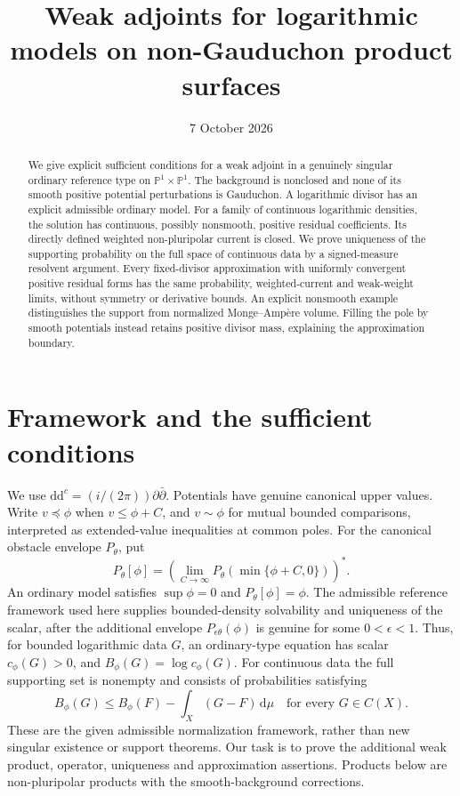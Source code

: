 \documentclass[11pt]{article}
\title{Weak adjoints for logarithmic models on non-Gauduchon product surfaces}
\author{}
\date{7 October 2026}
\newcommand{\ddc}{\mathrm{d}\mathrm{d}^c}
\begin{document}
\maketitle
\begin{abstract}
We give explicit sufficient conditions for a weak adjoint in a genuinely
singular ordinary reference type on $\mathbb P^1\times\mathbb P^1$.
The background is nonclosed and none of its smooth positive potential
perturbations is Gauduchon. A logarithmic divisor has an explicit admissible
ordinary model. For a family of continuous logarithmic densities, the
solution has continuous, possibly nonsmooth, positive residual coefficients.
Its directly defined weighted non-pluripolar current is closed. We prove
uniqueness of the supporting probability on the full space of continuous
data by a signed-measure resolvent argument. Every fixed-divisor approximation
with uniformly convergent positive residual forms has the same probability,
weighted-current and weak-weight limits, without symmetry or derivative
bounds. An explicit nonsmooth example distinguishes the support from
normalized Monge--Amp\`ere volume. Filling the pole by smooth potentials
instead retains positive divisor mass, explaining the approximation boundary.
\end{abstract}

\section{Framework and the sufficient conditions}

We use $\ddc=(i/(2\pi))\partial\bar\partial$. Potentials have genuine
canonical upper values. Write $v\preceq\phi$ when $v\le\phi+C$, and
$v\sim\phi$ for mutual bounded comparisons, interpreted as extended-value
inequalities at common poles. For the canonical obstacle envelope $P_\theta$,
put
\[
 P_\theta[\phi]=\left(\lim_{C\to\infty}
 P_\theta(\min\{\phi+C,0\})\right)^*.
\]
An ordinary model satisfies $\sup\phi=0$ and $P_\theta[\phi]=\phi$.
The admissible reference framework used here supplies bounded-density
solvability and uniqueness of the scalar, after the additional envelope
$P_{\epsilon\theta}(\phi)$ is genuine for some $0<\epsilon<1$.
Thus, for bounded logarithmic data $G$, an ordinary-type equation has scalar
$c_\phi(G)>0$, and $B_\phi(G)=\log c_\phi(G)$. For continuous data the full
supporting set is nonempty and consists of probabilities satisfying
\begin{equation}\label{eq:support}
 B_\phi(G)\le B_\phi(F)-\int_X(G-F)\,\mathrm{d}\mu
 \quad\text{for every }G\in C(X).
\end{equation}
These are the given admissible normalization framework, rather than new
singular existence or support theorems. Our task is to prove the additional
weak product, operator, uniqueness and approximation assertions. Products
below are non-pluripolar products with the smooth-background corrections.
\end{document}

